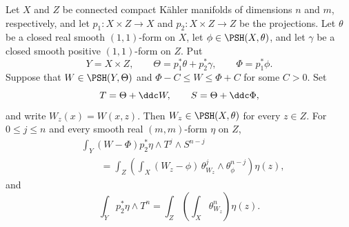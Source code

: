 \begin{corollary}\label{cor:compactfibreslicing}
    Let $X$ and $Z$ be connected compact Kähler manifolds of dimensions $n$ and $m$, respectively, and let $p_1\colon X\times Z\to X$ and $p_2\colon X\times Z\to Z$ be the projections. Let $\theta$ be a closed real smooth $(1,1)$-form on $X$, let $\phi\in\PSH(X,\theta)$, and let $\gamma$ be a closed smooth positive $(1,1)$-form on $Z$. Put
    \[
        Y=X\times Z,\qquad
        \Theta=p_1^*\theta+p_2^*\gamma,\qquad
        \Phi=p_1^*\phi.
    \]
    Suppose that $W\in\PSH(Y,\Theta)$ and $\Phi-C\leq W\leq\Phi+C$ for some $C>0$. Set
    \[
        T=\Theta+\ddc W,\qquad S=\Theta+\ddc\Phi,
    \]
    and write $W_z(x)=W(x,z)$. Then $W_z\in\PSH(X,\theta)$ for every $z\in Z$. For $0\leq j\leq n$ and every smooth real $(m,m)$-form $\eta$ on $Z$,
    \begin{equation}\label{eq:compactrelativeenergyslicing}
        \begin{aligned}
        &\int_Y(W-\Phi)p_2^*\eta\wedge T^j\wedge S^{n-j}\\
        &\qquad=\int_Z\left(\int_X(W_z-\phi)\,
        \theta_{W_z}^j\wedge\theta_\phi^{n-j}\right)\eta(z),
        \end{aligned}
    \end{equation}
    and
    \begin{equation}\label{eq:compactfibreslicingconstant}
        \int_Y p_2^*\eta\wedge T^n
        =\int_Z\left(\int_X\theta_{W_z}^n\right)\eta(z).
    \end{equation}
\end{corollary}
